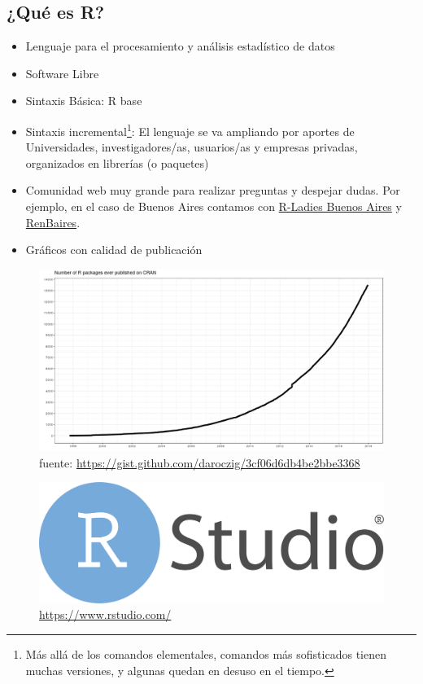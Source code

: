 \documentclass[]{book}
\providecommand{\tightlist}{%
  \setlength{\itemsep}{0pt}\setlength{\parskip}{0pt}}
\let\rmarkdownfootnote\footnote%
\def\footnote{\protect\rmarkdownfootnote}
\begin{document}
\hypertarget{que-es-r}{%
\subsection{¿Qué es R?}\label{que-es-r}}

\begin{itemize}
\tightlist
\item
  Lenguaje para el procesamiento y análisis estadístico de datos
\item
  Software Libre
\item
  Sintaxis Básica: R base
\item
  Sintaxis incremental\footnote{Más allá de los comandos elementales, comandos más sofisticados tienen muchas versiones, y algunas quedan en desuso en el tiempo.}: El lenguaje se va ampliando por aportes de Universidades, investigadores/as, usuarios/as y empresas privadas, organizados en librerías (o paquetes)
\item
  Comunidad web muy grande para realizar preguntas y despejar dudas. Por ejemplo, en el caso de Buenos Aires contamos con \href{https://www.meetup.com/es-ES/rladies-buenos-aires/}{R-Ladies Buenos Aires} y \href{https://www.meetup.com/es-ES/renbaires/}{RenBaires}.
\item
  Gráficos con calidad de publicación
\end{itemize}

\begin{figure}
\centering
\includegraphics[width=10.41667in,height=\textheight]{img/number-of-submitted-packages-to-CRAN.png}
\caption{fuente: \url{https://gist.github.com/daroczig/3cf06d6db4be2bbe3368}}
\end{figure}

\begin{figure}
\centering
\includegraphics[width=10.41667in,height=\textheight]{img/RStudio-Logo-Flat.png}
\caption{\url{https://www.rstudio.com/}}
\end{figure}
\end{document}
